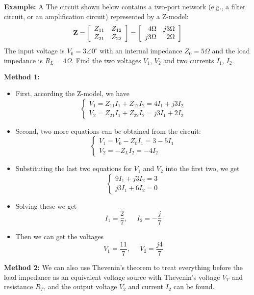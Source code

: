 \begin{itemize}

{\bf Example:} A The circuit shown below contains a two-port network (e.g., a 
filter circuit, or an amplification circuit) represented by a Z-model:
\[ {\bf Z}=\left[\begin{array}{ll} Z_{11} & Z_{12} \\ 
	Z_{21} & Z_{22} \end{array}\right]
	=\left[\begin{array}{rr} 4\Omega & j3\Omega \\ 
	j3\Omega & 2\Omega \end{array}\right]	\]
The input voltage is $V_0=3\angle 0^\circ$ with an internal impedance 
$Z_0=5\Omega$ and the load impedance is $R_L=4\Omega$. Find the two voltages 
$V_1$, $V_2$ and two currents $I_1$, $I_2$.


{\bf Method 1:} 
\begin{itemize}
\item First, according the Z-model, we have
\[ \left\{ \begin{array}{l} V_1=Z_{11}I_1+Z_{12}I_2= 4I_1+j3I_2 \\
	V_2=Z_{21}I_1+Z_{22}I_2=j3I_1+ 2I_2 \end{array} \right.	\]
\item Second, two more equations can be obtained from the circuit:
\[ \left\{ \begin{array}{l} V_1=V_0-Z_0 I_1=3-5I_1 \\
	V_2=-Z_L I_2=-4 I_2 \end{array} \right.	\]
\item Substituting the last two equations for $V_1$ and $V_2$ into the 
	first two, we get
\[ \left\{ \begin{array}{l} 9I_1+j3I_2=3 \\ j3I_1+6I_2=0 \end{array} \right. \]
\item Solving these we get 
\[	I_1=\frac{2}{7},\;\;\;\;\;I_2=-\frac{j}{7} \]
\item Then we can get the voltages
\[	V_1=\frac{11}{7},\;\;\;\;\;V_2=\frac{j4}{7} \]
\end{itemize}

{\bf Method 2:} We can also use Thevenin's theorem to treat everything before
the load impedance as an equivalent voltage source with Thevenin's voltage
$V_T$ and resistance $R_T$, and the output voltage $V_2$ and current 
$I_2$ can be found.


\end{itemize}
